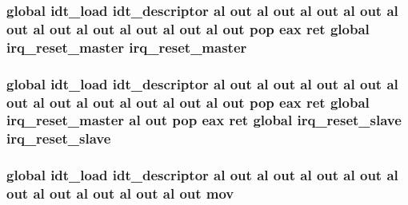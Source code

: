 \subsubsection[{\texorpdfstring{irq\+\_\+reset\+\_\+master}{irq_reset_master}}]{\setlength{\rightskip}{0pt plus 5cm}global {\bf idt\+\_\+load} {\bf idt\+\_\+descriptor} {\bf al} out {\bf al} out {\bf al} out {\bf al} out {\bf al} out {\bf al} out {\bf al} out {\bf al} out {\bf al} out {\bf al} out pop eax ret global irq\+\_\+reset\+\_\+master irq\+\_\+reset\+\_\+master}\hypertarget{idt_8as_ae016f971a439a159c81f4dea5c049163}{}\label{idt_8as_ae016f971a439a159c81f4dea5c049163}
\subsubsection[{\texorpdfstring{irq\+\_\+reset\+\_\+slave}{irq_reset_slave}}]{\setlength{\rightskip}{0pt plus 5cm}global {\bf idt\+\_\+load} {\bf idt\+\_\+descriptor} {\bf al} out {\bf al} out {\bf al} out {\bf al} out {\bf al} out {\bf al} out {\bf al} out {\bf al} out {\bf al} out {\bf al} out pop eax ret global {\bf irq\+\_\+reset\+\_\+master} {\bf al} out pop eax ret global irq\+\_\+reset\+\_\+slave irq\+\_\+reset\+\_\+slave}\hypertarget{idt_8as_a9d82c468fd56085554822f6d859aadfa}{}\label{idt_8as_a9d82c468fd56085554822f6d859aadfa}
\subsubsection[{\texorpdfstring{mov}{mov}}]{\setlength{\rightskip}{0pt plus 5cm}global {\bf idt\+\_\+load} {\bf idt\+\_\+descriptor} {\bf al} out {\bf al} out {\bf al} out {\bf al} out {\bf al} out {\bf al} out {\bf al} out {\bf al} out {\bf al} out mov}\hypertarget{idt_8as_a3ca38a9ff3527e8845b56e9de4e66b0d}{}\label{idt_8as_a3ca38a9ff3527e8845b56e9de4e66b0d}
